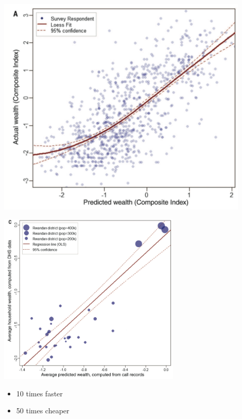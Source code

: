 \documentclass{beamer}
\begin{document}
\begin{frame}

\begin{center}
\includegraphics[width=0.9\textwidth]{figures/blumenstock_predicting_2015_fig1a}
\end{center}

\end{frame}
\begin{frame}

\begin{center}
\includegraphics[width=0.65\textwidth]{figures/blumenstock_predicting_2015_fig3c}
\end{center}

\pause

\begin{itemize}
\item 10 times faster
\item 50 times cheaper
\end{itemize}

\end{frame}
\end{document}

